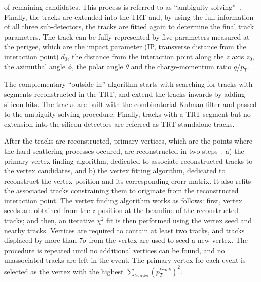 of remaining candidates.
This process is referred to as ``ambiguity solving''~\cite{PERF-2015-08}.
Finally, the tracks are extended into the TRT and, by using the full information
of all three sub-detectors, the tracks are fitted again to determine the final track
parameters. The track can be fully represented 
by five parameters measured at the perigee,
which are the impact parameter 
(IP, transverse distance from the interaction point) $d_0$, 
the distance from the interaction point along the $z$ axis $z_0$,
the azimuthal angle $\phi$, the polar angle $\theta$ 
and the charge-momentum ratio $q/p_T$.

The complementary ``outside-in'' algorithm starts with searching for tracks with segments 
reconstructed in the TRT, and extend the tracks inwards by adding silicon hits.
The tracks are built with the combinatorial Kalman filter and passed to the
ambiguity solving procedure.
Finally, tracks with a TRT segment but no extension into the silicon detectors
are referred as TRT-standalone tracks. 

After the tracks are reconstructed, primary vertices,
which are the points where the hard-scattering processes occured,
are reconstructed in two steps~\cite{ATLAS-CONF-2010-069}:
a) the primary vertex finding algorithm, 
dedicated to associate reconstructed tracks to the vertex candidates, 
and b) the vertex fitting algorithm, 
dedicated to reconstruct the vertex position and 
its corresponding erorr matrix. 
It also refits the associated
tracks constraining them to originate 
from the reconstructed interaction point.
The vertex finding algorithm works as follows:
first, vertex seeds are obtained from the $z$-position 
at the beamline of the reconstructed tracks; 
and then, an iterative $\chi^2$ fit is then performed 
using the vertex seed and nearby tracks. 
Vertices are required to contain at least two tracks, and 
tracks displaced by more than 7$\sigma$ from the vertex are used to
seed a new vertex.  The procedure is repeated 
until no additional vertices can be found, 
and no unassociated tracks are left in the event.
The primary vertex for each event is selected as the vertex with the highest
$\sum_{tracks}(p_T^{track})^2$.


